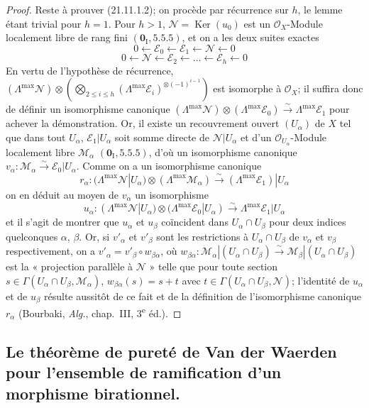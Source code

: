 \begin{proof}
Reste à prouver (21.11.1.2); on procède par récurrence sur $h$, le lemme étant trivial
pour $h=1$. Pour $h>1$, $\mathscr N=\operatorname{Ker}(u_0)$ est un
$\mathcal O_X$-Module localement libre de rang fini $(\mathbf 0_{\mathrm I}, 5.5.5)$,
et on a les deux suites exactes
\[
  0\leftarrow\mathscr E_0\leftarrow\mathscr E_1
  \leftarrow\mathscr N\leftarrow0
\]
\[
  0\leftarrow\mathscr N\leftarrow\mathscr E_2
  \leftarrow\ldots\leftarrow\mathscr E_h\leftarrow0
\]
En vertu de l'hypothèse de récurrence,
$(\Lambda^{\max}\mathscr N)\otimes
(\bigotimes_{2\leq i\leq h}(\Lambda^{\max}\mathscr E_i)^{\otimes(-1)^{i-1}})$
est isomorphe à $\mathcal O_X$; il suffira donc de définir un isomorphisme canonique
$(\Lambda^{\max}\mathscr N)\otimes(\Lambda^{\max}\mathscr E_0)\xrightarrow{\sim}\Lambda^{\max}\mathscr E_1$
pour achever la démonstration. Or, il existe un recouvrement ouvert $(U_\alpha)$ de
$X$ tel que dans tout $U_\alpha$, $\mathscr E_1|U_\alpha$ soit somme directe de
$\mathscr N|U_\alpha$ et d'un $\mathcal O_{U_\alpha}$-Module localement libre
$\mathscr M_\alpha$ $(\mathbf 0_{\mathrm I}, 5.5.5)$, d'où un isomorphisme canonique
$v_\alpha:\mathscr M_\alpha\xrightarrow{\sim}\mathscr E_0|U_\alpha$.
Comme on a un isomorphisme canonique
\[
  r_\alpha:(\Lambda^{\max}\mathscr N|U_\alpha)
  \otimes(\Lambda^{\max}\mathscr M_\alpha)
  \xrightarrow{\sim}(\Lambda^{\max}\mathscr E_1)|U_\alpha
\]
on en déduit au moyen de $v_\alpha$ un isomorphisme
\[
  u_\alpha:(\Lambda^{\max}\mathscr N|U_\alpha)
  \otimes(\Lambda^{\max}\mathscr E_0|U_\alpha)
  \xrightarrow{\sim}\Lambda^{\max}\mathscr E_1|U_\alpha
\]
et il s'agit de montrer que $u_\alpha$ et $u_\beta$ coïncident dans
$U_\alpha\cap U_\beta$ pour deux indices quelconques $\alpha$, $\beta$. Or, si
$v'_\alpha$ et $v'_\beta$ sont les restrictions à $U_\alpha\cap U_\beta$ de
$v_\alpha$ et $v_\beta$ respectivement, on a
$v'_\alpha=v'_\beta\circ w_{\beta\alpha}$, où
$w_{\beta\alpha}:\mathscr M_\alpha|(U_\alpha\cap U_\beta)\xrightarrow{\sim}\mathscr M_\beta|(U_\alpha\cap U_\beta)$
est la « projection parallèle à $\mathscr N$ » telle que pour toute section
$s\in\Gamma(U_\alpha\cap U_\beta,\mathscr M_\alpha)$,
$w_{\beta\alpha}(s)=s+t$ avec
$t\in\Gamma(U_\alpha\cap U_\beta,\mathscr N)$; l'identité de $u_\alpha$ et de
$u_\beta$ résulte aussitôt de ce fait et de la définition de l'isomorphisme canonique
$r_\alpha$ (Bourbaki, \emph{Alg.}, chap.~III, 3\textsuperscript{e} éd.).
\end{proof}

\subsection{Le théorème de pureté de Van der Waerden pour l'ensemble de
ramification d'un morphisme birationnel.}
\label{IV.21.12}

